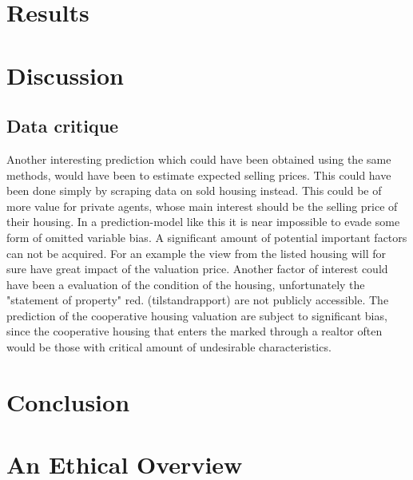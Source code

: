 \documentclass[12pt,a4paper]{article}
\begin{document}
\section{Results}

\section{Discussion}
\subsection{Data critique}
Another interesting prediction which could have been obtained using the same methods, would have been to estimate expected selling prices. This could have been done simply by scraping data on sold housing instead. This could be of more value for private agents, whose main interest should be the selling price of their housing. 
\newline 
In a prediction-model like this it is near impossible to evade some form of omitted variable bias. A significant amount of potential important factors can not be acquired. For an example the view from the listed housing will for sure have great impact of the valuation price. Another factor of interest could have been a evaluation of the condition of the housing, unfortunately the "statement of property" red. (tilstandrapport) are not publicly accessible. \newline
The prediction of the cooperative housing valuation %
are subject to significant bias, since the cooperative housing that enters the marked through a realtor often would be those with critical amount of undesirable characteristics. 


\section{Conclusion}

\section{An Ethical Overview}
\end{document}
